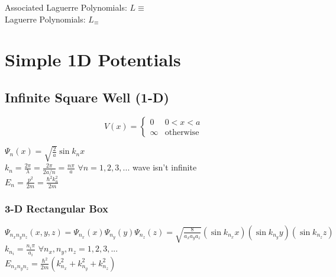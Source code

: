 \documentclass[12pt]{article}
\begin{document}
\vspace{10pt}\noindent
Associated Laguerre Polynomials: \hspace{18pt} \( \displaystyle
    L \equiv 
\) \\[10pt]
Laguerre Polynomials: \hspace{18pt} \( \displaystyle
    L_ \equiv 
\)

\newpage
\section{Simple 1D Potentials}

\subsection{Infinite Square Well (1-D)}
\boldmath \[ V(x) = \begin{cases}
    0 & 0<x<a \\
    \infty & \text{otherwise}
\end{cases} \] \unboldmath 

\vspace{15pt}\noindent
\( \displaystyle \Psi_n(x) = \sqrt{\frac{2}{a}} \sin{k_nx} \) \\[20pt]
\( \displaystyle k_n = \frac{2 \pi}{\lambda} = \frac{2 \pi}{2a/n} = \frac{n \pi}{a}\)
    \hspace{18pt} \( \forall n=1, 2, 3, ...\)         
    \hspace{18pt} \hspace{18pt}  
    \hspace{18pt} {\scriptsize wave isn't infinite} \\[20pt]
\( \displaystyle E_n = \frac{p^2}{2m} = \frac{\hbar^2 k_n^2}{2m}\)

\vspace{15pt}
\subsubsection{3-D Rectangular Box}
\( \displaystyle \Psi_{n_x n_y n_z}(x,y,z) = \Psi_{n_x}(x) \Psi_{n_y}(y) \Psi_{n_z}(z) 
    = \sqrt{\frac{8}{a_x a_y a_z}} (\sin{k_{n_x} x}) (\sin{k_{n_y} y}) (\sin{k_{n_z} z}) \) \\[20pt]
\( \displaystyle k_{n_i} = \frac{n_i \pi}{a_i}\)
    \hspace{18pt} \( \forall n_x, n_y, n_z = 1, 2, 3, ...\) \\[20pt]
\( \displaystyle E_{n_x n_y n_z} = \frac{\hbar^2}{2m} (k_{n_x}^2 + k_{n_y}^2 + k_{n_z}^2) \) 
\end{document}
